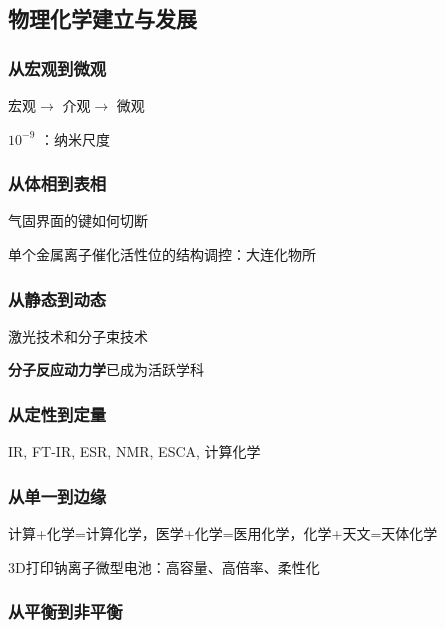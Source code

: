\subsection{物理化学建立与发展}%
\label{sub:物理化学建立与发展}
\subsubsection*{从宏观到微观}%
\label{subsub:从宏观到微观}

宏观$\to $ 介观$\to $ 微观
\begin{notation}
    $10^{-9}$ ：纳米尺度
\end{notation}
\subsubsection*{从体相到表相}%
\label{subsub:从体相到表相}
气固界面的键如何切断
\begin{eg}
    单个金属离子催化活性位的结构调控：大连化物所
\end{eg}
\subsubsection*{从静态到动态}%
\label{subsub:从静态到动态}

\begin{eg}
激光技术和分子束技术
\end{eg}
\begin{notation}
\textbf{分子反应动力学}已成为活跃学科
\end{notation}
\subsubsection*{从定性到定量}%
\label{subsub:从定性到定量}

\begin{eg}
    IR, FT-IR, ESR, NMR, ESCA, 计算化学
\end{eg}
\subsubsection*{从单一到边缘}%
\label{subsub:从单一到边缘}
\begin{eg}
    计算+化学=计算化学，医学+化学=医用化学，化学+天文=天体化学
\end{eg}
\begin{eg}
    3D打印钠离子微型电池：高容量、高倍率、柔性化
\end{eg}
\subsubsection*{从平衡到非平衡}%
\label{subsub:从平衡到非平衡}

